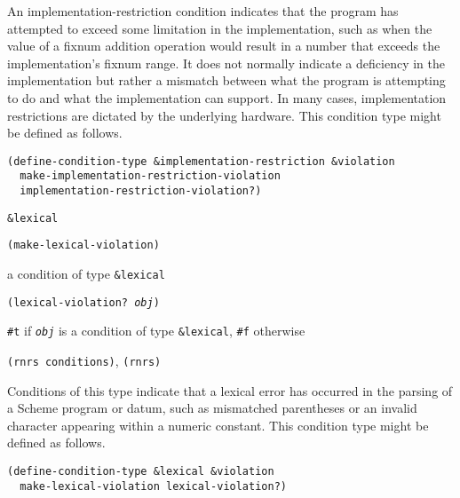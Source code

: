 An implementation-restriction condition indicates that the program has attempted
to exceed some limitation in the implementation, such as when the value of a
fixnum addition operation would result in a number that exceeds the implementation's
fixnum range.
It does not normally indicate a deficiency in the implementation but rather a
mismatch between what the program is attempting to do and what the implementation
can support.
In many cases, implementation restrictions are dictated by the underlying hardware.
This condition type might be defined as follows.

\begin{alltt}
(define-condition-type \&{}implementation-restriction \&{}violation
  make-implementation-restriction-violation
  implementation-restriction-violation?)
\end{alltt}

\begin{description}

\label{exceptions_s29}\item[syntax] \texttt{\&{}lexical}



\item[procedure] \texttt{(make-lexical-violation)}



\item[returns] a condition of type \texttt{\&{}lexical}


\item[procedure] \texttt{(lexical-violation? \textit{obj})}



\item[returns] \texttt{\#{}t} if \texttt{\textit{obj}} is a condition of type \texttt{\&{}lexical}, \texttt{\#{}f} otherwise


\item[libraries] \texttt{(rnrs conditions)}, \texttt{(rnrs)}
\end{description}



Conditions of this type indicate that a lexical error has occurred in the parsing
of a Scheme program or datum, such as mismatched parentheses or an invalid character
appearing within a numeric constant.
This condition type might be defined as follows.

\begin{alltt}
(define-condition-type \&{}lexical \&{}violation
  make-lexical-violation lexical-violation?)
\end{alltt}

